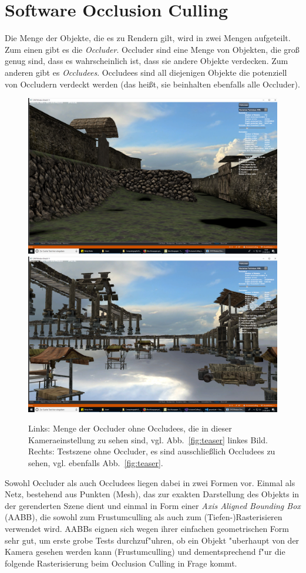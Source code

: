 \documentclass[journal]{vgtc}
\begin{document}
\section{Software Occlusion Culling}
Die Menge der Objekte, die es zu Rendern gilt, wird in zwei Mengen aufgeteilt. Zum einen gibt es die \textit{Occluder}. Occluder sind eine Menge von Objekten, die gro{\ss} genug sind, dass es wahrscheinlich ist, dass sie andere Objekte verdecken. Zum anderen gibt es \textit{Occludees}. Occludees sind all diejenigen Objekte die potenziell von Occludern verdeckt werden (das hei{\ss}t, sie beinhalten ebenfalls alle Occluder).
\begin{figure}%
\includegraphics[width=0.5\columnwidth]{images/Occluder.png}%
\includegraphics[width=0.5\columnwidth]{images/Occludees.png}%
\caption{Links: Menge der Occluder ohne Occludees, die in dieser Kameraeinstellung zu sehen sind, vgl. Abb.\ \ref{fig:teaser} linkes Bild. Rechts: Testszene ohne Occluder, es sind ausschlie{\ss}lich Occludees zu sehen, vgl. ebenfalls Abb.\ \ref{fig:teaser}.}%
\label{fig:objects}%
\end{figure}
 Sowohl Occluder als auch Occludees liegen dabei in zwei Formen vor. Einmal als Netz, bestehend aus Punkten (Mesh), das zur exakten Darstellung des Objekts in der gerenderten Szene dient und einmal in Form einer \textit{Axis Aligned Bounding Box} (AABB), die sowohl zum Frustumculling als auch zum (Tiefen-)Rasterisieren verwendet wird. AABBs eignen sich wegen ihrer einfachen geometrischen Form sehr gut, um erste grobe Tests durchzuf"uhren, ob ein Objekt "uberhaupt von der Kamera gesehen werden kann (Frustumculling) und dementsprechend f"ur die folgende Rasterisierung beim Occlusion Culling in Frage kommt. 
\end{document}

